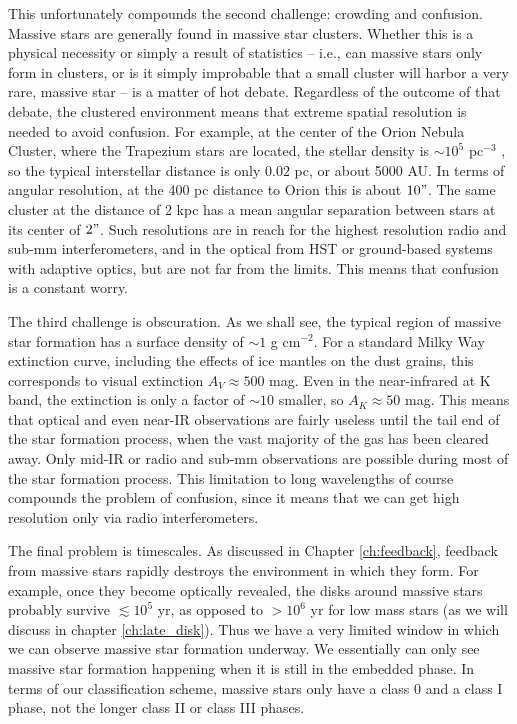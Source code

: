 This unfortunately compounds the second challenge: crowding and confusion. Massive stars are generally found in massive star clusters. Whether this is a physical necessity or simply a result of statistics -- i.e., can massive stars only form in clusters, or is it simply improbable that a small cluster will harbor a very rare, massive star -- is a matter of hot debate. Regardless of the outcome of that debate, the clustered environment means that extreme spatial resolution is needed to avoid confusion. For example, at the center of the Orion Nebula Cluster, where the Trapezium stars are located, the stellar density is $\sim 10^5$ pc$^{-3}$ \citep{hillenbrand98a}, so the typical interstellar distance is only $0.02$ pc, or about 5000 AU. In terms of angular resolution, at the 400 pc distance to Orion this is about $10"$. The same cluster at the distance of 2 kpc has a mean angular separation between stars at its center of $2"$. Such resolutions are in reach for the highest resolution radio and sub-mm interferometers, and in the optical from HST or ground-based systems with adaptive optics, but are not far from the limits. This means that confusion is a constant worry.

The third challenge is obscuration. As we shall see, the typical region of massive star formation has a surface density of $\sim 1$ g cm$^{-2}$. For a standard Milky Way extinction curve, including the effects of ice mantles on the dust grains, this corresponds to visual extinction $A_V\approx 500$ mag. Even in the near-infrared at K band, the extinction is only a factor of $\sim 10$ smaller, so $A_K\approx 50$ mag. This means that optical and even near-IR observations are fairly useless until the tail end of the star formation process, when the vast majority of the gas has been cleared away. Only mid-IR or radio and sub-mm observations are possible during most of the star formation process. This limitation to long wavelengths of course compounds the problem of confusion, since it means that we can get high resolution only via radio interferometers.

The final problem is timescales. As discussed in Chapter \ref{ch:feedback}, feedback from massive stars rapidly destroys the environment in which they form. For example, once they become optically revealed, the disks around massive stars probably survive $\lesssim 10^5$ yr, as opposed to $>10^6$ yr for low mass stars (as we will discuss in chapter \ref{ch:late_disk}). Thus we have a very limited window in which we can observe massive star formation underway. We essentially can only see massive star formation happening when it is still in the embedded phase. In terms of our classification scheme, massive stars only have a class 0 and a class I phase, not the longer class II or class III phases.

